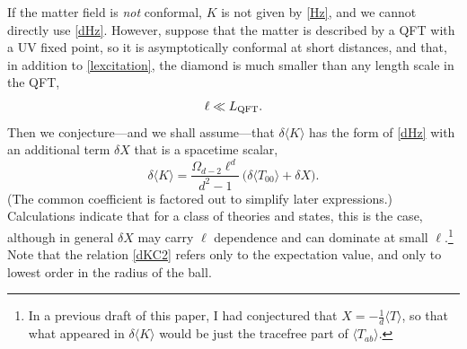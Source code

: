 \documentclass[aps,prd,showpacs,groupedaddress,nofootinbib,longbibliography,12pt]{revtex4-1}
\def\beq{\begin{equation}}
\def\eeq{\end{equation}}
\def\la{\langle}
\def\ra{\rangle}
\def\d{\delta}\def\D{\Delta}
\def\z{\zeta}
\def\O{\Omega}
\begin{document}
If the matter field is {\it not} conformal, $K$ is not given by \eqref{Hz}, and we cannot directly use \eqref{dHz}.
However, suppose that the matter is described by a QFT with a UV fixed point, so it is 
asymptotically conformal at short distances, and that, in addition to \eqref{lexcitation}, 
the diamond is much smaller than 
any length scale in the QFT, 
%
\beq
\ell\ll L_{\rm QFT}.
\eeq
%
Then we conjecture---and we shall assume---that $\d \la K\ra$ 
has the form of  \eqref{dHz} with an additional term $\d X$ that is a spacetime scalar,
%
\beq\label{dKC2}
\d \la K\ra =\frac{\O_{d-2} \ell^d }{d^2-1}\, \bigl(\d\la T_{00}\ra+\d X\bigr).
\eeq
%
(The common coefficient is factored out to simplify later expressions.)
Calculations \cite{Casini:2016rwj,Speranza:2016jwt} indicate that for a class of theories and states,
this is the case, although in general 
$\d X$ may carry $\ell$ dependence and can dominate at small $\ell$.\footnote{In 
a previous draft of this paper, I had conjectured that $X=-\frac1d \la T\ra$, 
so that what appeared in $\d\la K\ra$ would be just the tracefree part of $\la T_{ab}\ra$.} 
Note that the relation \eqref{dKC2} refers only to the expectation value, and only to 
lowest order in the radius of the ball.




\end{document}
